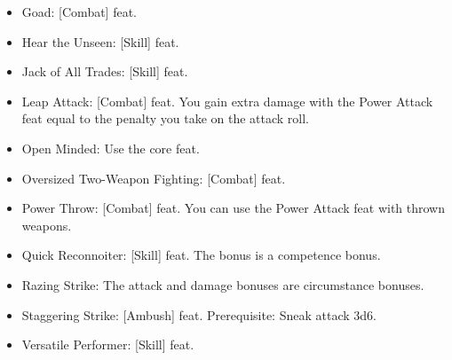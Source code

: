 \begin{itemize}
\item Goad: [Combat] feat.
\item Hear the Unseen: [Skill] feat.
\item Jack of All Trades: [Skill] feat.
\item Leap Attack: [Combat] feat. You gain extra damage with the Power Attack feat equal to the penalty you take on the attack roll.
\item Open Minded: Use the core feat.
\item Oversized Two-Weapon Fighting: [Combat] feat.
\item Power Throw: [Combat] feat. You can use the Power Attack feat with thrown weapons.
\item Quick Reconnoiter: [Skill] feat. The bonus is a competence bonus.
\item Razing Strike: The attack and damage bonuses are circumstance bonuses.
\item Staggering Strike: [Ambush] feat. Prerequisite: Sneak attack \plus3d6.
\item Versatile Performer: [Skill] feat.
\end{itemize}
